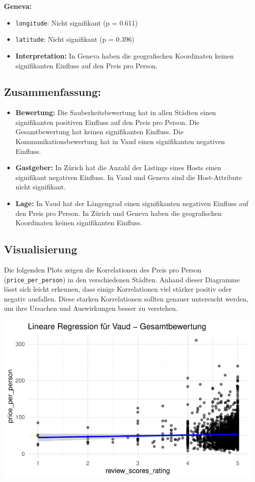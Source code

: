 \documentclass[
  journal,
]{IEEEtran}%
\providecommand{\tightlist}{%
  \setlength{\itemsep}{0pt}\setlength{\parskip}{0pt}}\usepackage{longtable,booktabs,array}
\begin{document}
\textbf{Geneva:}

\begin{itemize}
\item
  \texttt{longitude}: Nicht signifikant (p = 0.611)
\item
  \texttt{latitude}: Nicht signifikant (p = 0.396)
\item
  \textbf{Interpretation:} In Geneva haben die geografischen Koordinaten
  keinen signifikanten Einfluss auf den Preis pro Person.
\end{itemize}

\subsection{Zusammenfassung:}\label{zusammenfassung}

\begin{itemize}
\tightlist
\item
  \textbf{Bewertung:} Die Sauberkeitsbewertung hat in allen Städten
  einen signifikanten positiven Einfluss auf den Preis pro Person. Die
  Gesamtbewertung hat keinen signifikanten Einfluss. Die
  Kommunikationsbewertung hat in Vaud einen signifikanten negativen
  Einfluss.
\item
  \textbf{Gastgeber:} In Zürich hat die Anzahl der Listings eines Hosts
  einen signifikant negativen Einfluss. In Vaud und Geneva sind die
  Host-Attribute nicht signifikant.
\item
  \textbf{Lage:} In Vaud hat der Längengrad einen signifikanten
  negativen Einfluss auf den Preis pro Person. In Zürich und Geneva
  haben die geografischen Koordinaten keinen signifikanten Einfluss.
\end{itemize}

\subsection{\texorpdfstring{\textbf{Visualisierung}}{Visualisierung}}\label{visualisierung-1}

Die folgenden Plots zeigen die Korrelationen des Preis pro Person
(\texttt{price\_per\_person}) in den verschiedenen Städten. Anhand
dieser Diagramme lässt sich leicht erkennen, dass einige Korrelationen
viel stärker positiv oder negativ ausfallen. Diese starken Korrelationen
sollten genauer untersucht werden, um ihre Ursachen und Auswirkungen
besser zu verstehen.

\includegraphics{main_files/figure-pdf/unnamed-chunk-15-1.pdf}
\end{document}
